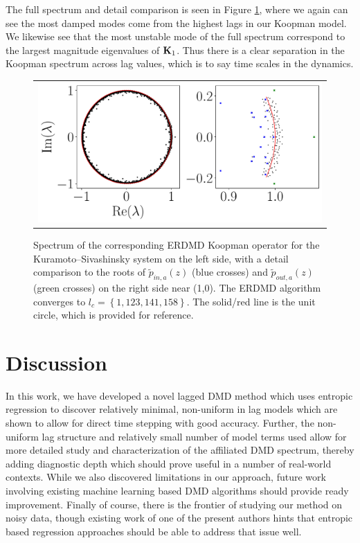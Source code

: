 \documentclass[a4paper,11pt]{article}
\begin{document}
The full spectrum and detail comparison is seen in Figure \ref{fig:ksspectrum}, where we again can see the most damped modes come from the highest lags in our Koopman model.  We likewise see that the most unstable mode of the full spectrum correspond to the largest magnitude eigenvalues of ${\bf K}_{1}$.  Thus there is a clear separation in the Koopman spectrum across lag values, which is to say time scales in the dynamics.     
\begin{figure}[!h]
\centering
\begin{tabular}{c}
\includegraphics[width=1\textwidth]{Kuramoto_detail_spectrum_w_mx_lag_158} \end{tabular}
\caption{Spectrum of the corresponding ERDMD Koopman operator for the Kuramoto--Sivashinsky system on the left side, with a detail comparison to the roots of $\tilde{p}_{in,a}(z)$ (blue crosses) and $\tilde{p}_{out,a}(z)$ (green crosses) on the right side near (1,0).  The ERDMD algorithm converges to $l_{c}=\left\{1, 123, 141, 158\right\}$.  The solid/red line is the unit circle, which is provided for reference.}
\label{fig:ksspectrum}
\end{figure}

\section{Discussion}
In this work, we have developed a novel lagged DMD method which uses entropic regression to discover relatively minimal, non-uniform in lag models which are shown to allow for direct time stepping with good accuracy.  Further, the non-uniform lag structure and relatively small number of model terms used allow for more detailed study and characterization of the affiliated DMD spectrum, thereby adding diagnostic depth which should prove useful in a number of real-world contexts.  While we also discovered limitations in our approach, future work involving existing machine learning based DMD algorithms should provide ready improvement.  Finally of course, there is the frontier of studying our method on noisy data, though existing work of one of the present authors hints that entropic based regression approaches should be able to address that issue well.  
\end{document}
